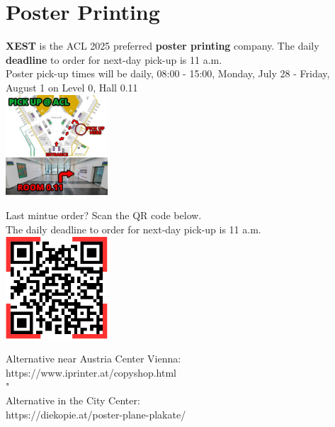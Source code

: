 \chapter{Poster Printing}
\vspace*{0.2cm}


\textbf{XEST} is the ACL 2025 preferred \textbf{poster printing} company. The daily \textbf{deadline} to order for next-day pick-up is 11 a.m.\\
 
Poster pick-up times will be daily, 08:00 - 15:00, Monday, July 28 - Friday, August 1 on Level 0, Hall 0.11\\

\includegraphics[width=1.5in]{examples/acl25-handbook/sponsorship/PosterPickUpMap.png}




Last mintue order? Scan the QR code below.\\
The daily deadline to order for next-day pick-up is 11 a.m.\\

\includegraphics[width=1.5in]{examples/acl25-handbook/sponsorship/PosterPrintingQRCode.png}




Alternative near Austria Center Vienna:\\
https://www.iprinter.at/copyshop.html	\\																								"
\\
Alternative in the City Center:\\
https://diekopie.at/poster-plane-plakate/\\

